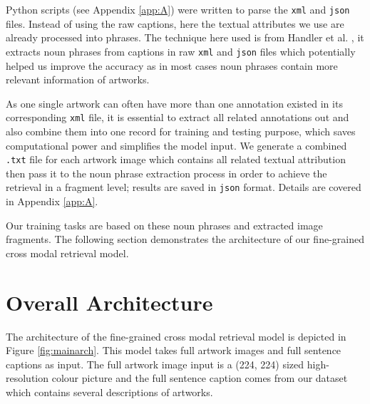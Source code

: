 Python scripts (see Appendix \ref{app:A}) were written to parse the \verb|xml| and \verb|json| files. Instead of using the raw captions, here the textual attributes we use are already processed into phrases. The technique here used is from Handler et al. \cite{nounphrase}, it extracts noun phrases from captions in raw \verb|xml| and \verb|json| files which potentially helped us improve the accuracy as in most cases noun phrases contain more relevant information of artworks.  

As one single artwork can often have more than one annotation existed in its corresponding \verb|xml| file, it is essential to extract all related annotations out and also combine them into one record for training and testing purpose, which saves computational power and simplifies the model input. We generate a combined \verb|.txt| file for each artwork image which contains all related textual attribution then pass it to the noun phrase extraction process in order to achieve the retrieval in a fragment level; results are saved in \verb|json| format. Details are covered in Appendix \ref{app:A}.



Our training tasks are based on these noun phrases and extracted image fragments. The following section demonstrates the architecture of our fine-grained cross modal retrieval model.

\section{Overall Architecture}

The architecture of the fine-grained cross modal retrieval model is depicted in Figure \ref{fig:mainarch}. This model takes full artwork images and full sentence captions as input. The full artwork image input is a (224, 224) sized high-resolution colour picture and the full sentence caption comes from our dataset which contains several descriptions of artworks.

